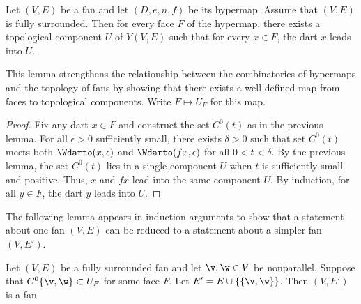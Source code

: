 \begin{lemma} \label{lemma:UF}
Let $(V,E)$ be a fan and let $(D,e,n,f)$ be its hypermap.  Assume that $(V,E)$
is fully surrounded.  Then for every face $F$ of the hypermap, there
exists a topological component $U$ of $Y(V,E)$ such that for every
$x\in F$, the dart $x$ leads into $U$.
\end{lemma}
%
%
%

This lemma strengthens the relationship between the
combinatorics of hypermaps and the topology of fans by showing that there exists a
well-defined map from faces to topological components.  Write
$F\mapsto U_F$ for this map.
%

\begin{proof} Fix any dart $x\in F$ and construct the set $C^0(t)$ as
in the previous lemma.  For all $\epsilon>0$ sufficiently small,
there exists $\delta>0$ such that set $C^0(t)$ meets both
$\Wdarto(x,\epsilon)$ and $\Wdarto(f x,\epsilon)$ for all
$0<t<\delta$.  By the previous lemma, the set $C^0(t)$ lies in a
single component $U$ when $t$ is sufficiently small and positive.
Thus, $x$ and $f x$ lead into the same component $U$.  By induction,
for all $y\in F$, the dart $y$ leads into $U$.
\end{proof}
%
%

The following lemma appears in induction arguments to show
that a statement about one fan $(V,E)$ can be reduced to a statement
about a simpler fan $(V,E')$.

\begin{lemma}\cutrate{}\label{lemma:add-edge}
  Let $(V,E)$ be a fully surrounded fan and let $\v,\w\in V$ be
  nonparallel.  Suppose that $C^0\{\v,\w\}\subset U_F$ for some face
  $F$.  Let $E' = E\cup\{\{\v,\w\}\}$.  Then $(V,E')$ is a fan.
\end{lemma}

